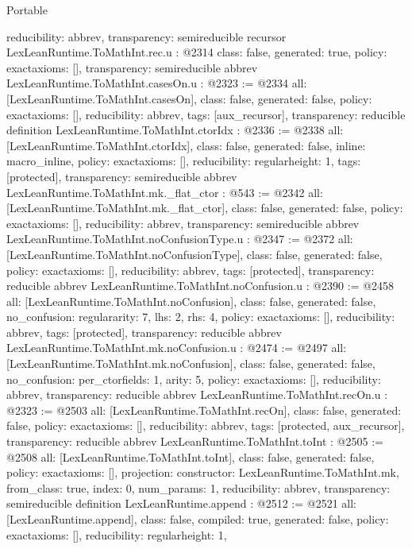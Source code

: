 \begin{lexlean}{Portable}
\begin{coremodule}
{  reducibility: abbrev{},
  transparency: semireducible
}
recursor LexLeanRuntime.ToMathInt.rec.{u} : @2314 {
  class: false,
  generated: true,
  policy: exact{axioms: []},
  transparency: semireducible
}
abbrev LexLeanRuntime.ToMathInt.casesOn.{u} : @2323 := @2334 {
  all: [LexLeanRuntime.ToMathInt.casesOn],
  class: false,
  generated: false,
  policy: exact{axioms: []},
  reducibility: abbrev{},
  tags: [aux_recursor],
  transparency: reducible
}
definition LexLeanRuntime.ToMathInt.ctorIdx : @2336 := @2338 {
  all: [LexLeanRuntime.ToMathInt.ctorIdx],
  class: false,
  generated: false,
  inline: macro_inline,
  policy: exact{axioms: []},
  reducibility: regular{height: 1},
  tags: [protected],
  transparency: semireducible
}
abbrev LexLeanRuntime.ToMathInt.mk._flat_ctor : @543 := @2342 {
  all: [LexLeanRuntime.ToMathInt.mk._flat_ctor],
  class: false,
  generated: false,
  policy: exact{axioms: []},
  reducibility: abbrev{},
  transparency: semireducible
}
abbrev LexLeanRuntime.ToMathInt.noConfusionType.{u} : @2347 := @2372 {
  all: [LexLeanRuntime.ToMathInt.noConfusionType],
  class: false,
  generated: false,
  policy: exact{axioms: []},
  reducibility: abbrev{},
  tags: [protected],
  transparency: reducible
}
abbrev LexLeanRuntime.ToMathInt.noConfusion.{u} : @2390 := @2458 {
  all: [LexLeanRuntime.ToMathInt.noConfusion],
  class: false,
  generated: false,
  no_confusion: regular{arity: 7, lhs: 2, rhs: 4},
  policy: exact{axioms: []},
  reducibility: abbrev{},
  tags: [protected],
  transparency: reducible
}
abbrev LexLeanRuntime.ToMathInt.mk.noConfusion.{u} : @2474 := @2497 {
  all: [LexLeanRuntime.ToMathInt.mk.noConfusion],
  class: false,
  generated: false,
  no_confusion: per_ctor{fields: 1, arity: 5},
  policy: exact{axioms: []},
  reducibility: abbrev{},
  transparency: reducible
}
abbrev LexLeanRuntime.ToMathInt.recOn.{u} : @2323 := @2503 {
  all: [LexLeanRuntime.ToMathInt.recOn],
  class: false,
  generated: false,
  policy: exact{axioms: []},
  reducibility: abbrev{},
  tags: [protected, aux_recursor],
  transparency: reducible
}
abbrev LexLeanRuntime.ToMathInt.toInt : @2505 := @2508 {
  all: [LexLeanRuntime.ToMathInt.toInt],
  class: false,
  generated: false,
  policy: exact{axioms: []},
  projection: {constructor: LexLeanRuntime.ToMathInt.mk, from_class: true, index: 0, num_params: 1},
  reducibility: abbrev{},
  transparency: semireducible
}
definition LexLeanRuntime.append : @2512 := @2521 {
  all: [LexLeanRuntime.append],
  class: false,
  compiled: true,
  generated: false,
  policy: exact{axioms: []},
  reducibility: regular{height: 1},
}
\end{coremodule}
\end{lexlean}
